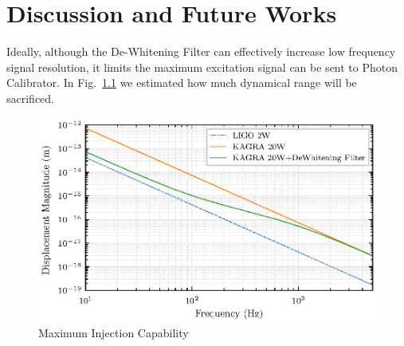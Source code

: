 




\chapter{Discussion and Future Works}

Ideally, although the De-Whitening Filter can effectively increase low frequency signal resolution, it limits the maximum excitation signal can be sent to Photon Calibrator. In Fig.~\ref{fig:injcapdew} we estimated how much dynamical range will be sacrificed. 

\begin{figure}[bt]
\centering
\includegraphics[width=1\textwidth]{figure/20WdeW}
\caption{Maximum Injection Capability}\label{fig:injcapdew}
\end{figure}



